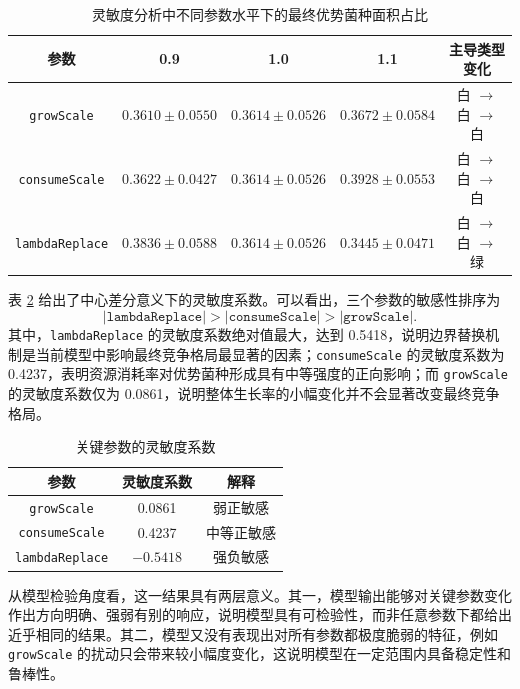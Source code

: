 \documentclass[12pt,a4paper]{ctexart}
\begin{document}
\begin{table}[H]
\centering
\caption{灵敏度分析中不同参数水平下的最终优势菌种面积占比}
\label{tab:sensitivity_meanstd}
\begin{tabular}{ccccc}
\toprule
参数 & 0.9 & 1.0 & 1.1 & 主导类型变化 \\
\midrule
\texttt{growScale} 
& $0.3610 \pm 0.0550$ 
& $0.3614 \pm 0.0526$ 
& $0.3672 \pm 0.0584$ 
& 白 $\rightarrow$ 白 $\rightarrow$ 白 \\

\texttt{consumeScale}
& $0.3622 \pm 0.0427$ 
& $0.3614 \pm 0.0526$ 
& $0.3928 \pm 0.0553$ 
& 白 $\rightarrow$ 白 $\rightarrow$ 白 \\

\texttt{lambdaReplace}
& $0.3836 \pm 0.0588$ 
& $0.3614 \pm 0.0526$ 
& $0.3445 \pm 0.0471$ 
& 白 $\rightarrow$ 白 $\rightarrow$ 绿 \\
\bottomrule
\end{tabular}
\end{table}

表 \ref{tab:sensitivity_coeff} 给出了中心差分意义下的灵敏度系数。可以看出，三个参数的敏感性排序为
\[
|\texttt{lambdaReplace}| > |\texttt{consumeScale}| > |\texttt{growScale}|.
\]
其中，\texttt{lambdaReplace} 的灵敏度系数绝对值最大，达到 0.5418，说明边界替换机制是当前模型中影响最终竞争格局最显著的因素；\texttt{consumeScale} 的灵敏度系数为 0.4237，表明资源消耗率对优势菌种形成具有中等强度的正向影响；而 \texttt{growScale} 的灵敏度系数仅为 0.0861，说明整体生长率的小幅变化并不会显著改变最终竞争格局。

\begin{table}[H]
\centering
\caption{关键参数的灵敏度系数}
\label{tab:sensitivity_coeff}
\begin{tabular}{ccc}
\toprule
参数 & 灵敏度系数 & 解释 \\
\midrule
\texttt{growScale} & 0.0861 & 弱正敏感 \\
\texttt{consumeScale} & 0.4237 & 中等正敏感 \\
\texttt{lambdaReplace} & $-0.5418$ & 强负敏感 \\
\bottomrule
\end{tabular}
\end{table}

从模型检验角度看，这一结果具有两层意义。其一，模型输出能够对关键参数变化作出方向明确、强弱有别的响应，说明模型具有可检验性，而非任意参数下都给出近乎相同的结果。其二，模型又没有表现出对所有参数都极度脆弱的特征，例如 \texttt{growScale} 的扰动只会带来较小幅度变化，这说明模型在一定范围内具备稳定性和鲁棒性。
\end{document}

